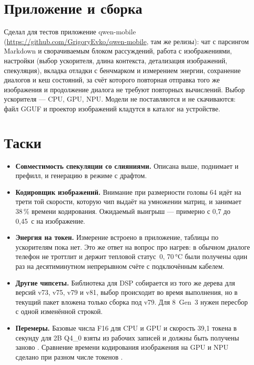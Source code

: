 \documentclass[11pt]{article}
\begin{document}
\section{Приложение и сборка}

Сделал для тестов приложение qwen-mobile
(\url{https://github.com/GrigoryEvko/qwen-mobile}, там же релизы): чат с
парсингом Markdown и сворачиваемым блоком
рассуждений, работа с изображениями, настройки (выбор ускорителя, длина
контекста, детализация изображений, спекуляция), вкладка отладки с бенчмарком
и измерением энергии, сохранение диалогов и кеш состояний, за счёт которого
повторная отправка того же изображения и продолжение диалога не требуют
повторных вычислений. Выбор ускорителя --- CPU, GPU, NPU. Модели не
поставляются и не скачиваются: файл GGUF и проектор изображений кладутся в
каталог на устройстве.

\section{Таски}

\begin{itemize}
\item \textbf{Совместимость спекуляции со слияниями.} Описана выше, поднимает
и префилл, и генерацию в режиме с драфтом.
\item \textbf{Кодировщик изображений.} Внимание при размерности головы 64 идёт
на трети той скорости, которую чип выдаёт на умножении матриц, и занимает
38\,\% времени кодирования. Ожидаемый выигрыш --- примерно с 0{,}7 до
0{,}45~с на изображение.
\item \textbf{Энергия на токен.} Измерение встроено в приложение, таблицы по
ускорителям пока нет. Это же ответ на вопрос про нагрев: в обычном диалоге
телефон не троттлит и держит тепловой статус~0, 70\,°C были получены один раз
на десятиминутном непрерывном счёте с подключённым кабелем.
\item \textbf{Другие чипсеты.} Библиотека для DSP собирается из того же дерева
для версий v73, v75, v79 и v81, выбор происходит во время выполнения, но в
текущий пакет вложена только сборка под v79. Для 8~Gen~3 нужен пересбор с
одной изменённой строкой.
\item \textbf{Перемеры.} Базовые числа F16 для CPU и GPU и скорость 39{,}1
токена в секунду для 2B Q4\_0 взяты из рабочих записей и должны быть получены
заново . Сравнение времени
кодирования изображения на GPU и NPU сделано при разном числе токенов
.
\end{itemize}
\end{document}
